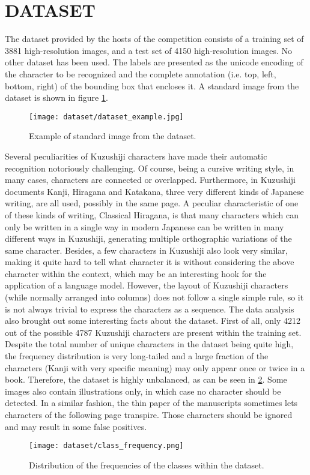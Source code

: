 \section{DATASET}
\label{sec:dataset}

The dataset provided by the hosts of the competition consists of a training set of 3881 high-resolution images, and a test set of 4150 high-resolution images. No other dataset  has been used. The labels are presented as the unicode encoding of the character to be recognized and the complete annotation (i.e. top, left, bottom, right) of the bounding box that encloses it. A standard image from the dataset is shown in figure \ref{fig:dataset_example}. \\

\begin{figure}[h]
	\caption{Example of standard image from the dataset.}
	\centering
	\texttt{[image: dataset/dataset\_example.jpg]}
	\label{fig:dataset_example}
\end{figure}

Several peculiarities of Kuzushiji characters have made their automatic recognition notoriously challenging. Of course, being a cursive writing style, in many cases, characters are connected or overlapped. Furthermore, in Kuzushiji documents Kanji, Hiragana and Katakana, three very different kinds of Japanese writing, are all used, possibly in the same page. A peculiar characteristic of one of these kinds of writing, Classical Hiragana, is that many characters which can only be written in a single way in modern Japanese can be written in many different ways in Kuzushiji, generating multiple orthographic variations of the same character. Besides, a few characters in Kuzushiji also look very similar, making it quite hard to tell what character it is without considering the above character within the context, which may be an interesting hook for the application of a language model. However, the layout of Kuzushiji characters (while normally arranged into columns) does not follow a single simple rule, so it is not always trivial to express the characters as a sequence. The data analysis also brought out some interesting facts about the dataset. First of all, only 4212 out of the possible 4787 Kuzushiji characters are present within the training set. Despite the total number of unique characters in the dataset being quite high, the frequency distribution is very long-tailed and a large fraction of the characters (Kanji with very specific meaning) may only appear once or twice in a book. Therefore, the dataset is highly unbalanced, as can be seen in \ref{fig:class-frequency}. Some images also contain illustrations only, in which case no character should be detected. In a similar fashion, the thin paper of the manuscripts sometimes lets characters of the following page transpire. Those characters should be ignored and may result in some false positives.


\begin{figure}[h]
	\caption{Distribution of the frequencies of the classes within the dataset.}
	\centering
	\texttt{[image: dataset/class\_frequency.png]}
	\label{fig:class-frequency}
\end{figure}
